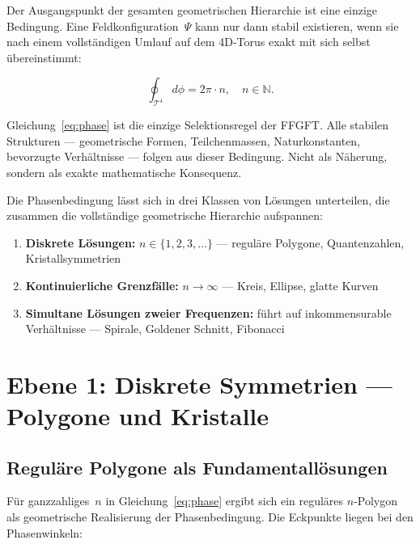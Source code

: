 Der Ausgangspunkt der gesamten geometrischen Hierarchie ist eine einzige
Bedingung. Eine Feldkonfiguration~$\Psi$ kann nur dann stabil existieren,
wenn sie nach einem vollständigen Umlauf auf dem 4D-Torus exakt mit sich
selbst übereinstimmt:

\begin{equation}
  \oint_{\mathcal{T}^4} d\phi = 2\pi \cdot n, \quad n \in \mathbb{N}.
  \label{eq:phase}
\end{equation}

\begin{keybox}[Grundprinzip]
Gleichung~\eqref{eq:phase} ist die einzige Selektionsregel der FFGFT.
Alle stabilen Strukturen — geometrische Formen, Teilchenmassen,
Naturkonstanten, bevorzugte Verhältnisse — folgen aus dieser Bedingung.
Nicht als Näherung, sondern als exakte mathematische Konsequenz.
\end{keybox}

Die Phasenbedingung lässt sich in drei Klassen von Lösungen unterteilen,
die zusammen die vollständige geometrische Hierarchie aufspannen:

\begin{enumerate}
  \item \textbf{Diskrete Lösungen:} $n \in \{1, 2, 3, \ldots\}$ — reguläre
    Polygone, Quantenzahlen, Kristallsymmetrien
  \item \textbf{Kontinuierliche Grenzfälle:} $n \to \infty$ —
    Kreis, Ellipse, glatte Kurven
  \item \textbf{Simultane Lösungen zweier Frequenzen:} führt auf
    inkommensurable Verhältnisse — Spirale, Goldener Schnitt, Fibonacci
\end{enumerate}

\section{Ebene 1: Diskrete Symmetrien — Polygone und Kristalle}

\subsection{Reguläre Polygone als Fundamentallösungen}

Für ganzzahliges~$n$ in Gleichung~\eqref{eq:phase} ergibt sich ein
reguläres $n$-Polygon als geometrische Realisierung der Phasenbedingung.
Die Eckpunkte liegen bei den Phasenwinkeln:


